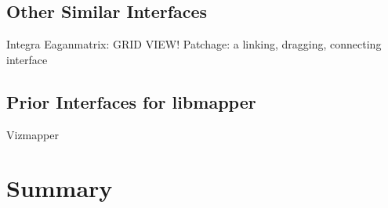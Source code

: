 	\subsection{Other Similar Interfaces}
		Integra 
		Eaganmatrix: GRID VIEW! 
		Patchage: a linking, dragging, connecting interface 
	\subsection{Prior Interfaces for libmapper} \label{sec:priorGUIs}
		Vizmapper 
	

\section{Summary}
	